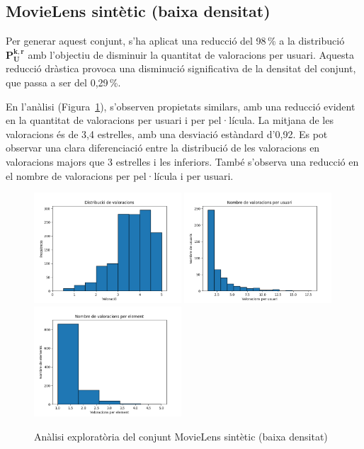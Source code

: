 \documentclass[a4paper,12pt]{report}
\begin{document}
\subsection{MovieLens sintètic (baixa densitat)}

Per generar aquest conjunt, s'ha aplicat una reducció del 98\,\% a la distribució $\mathbf{P_U^{k,r}}$ amb l'objectiu de disminuir la quantitat de valoracions per usuari.
Aquesta reducció dràstica provoca una disminució significativa de la densitat del conjunt, que passa a ser del 0,29\,\%.

En l'anàlisi (Figura~\ref{fig:analisis_ml_synthetic_low_dens}), s'observen propietats similars, amb una reducció evident en la quantitat de valoracions per usuari i per pel·lícula. La mitjana de les valoracions és de 3,4 estrelles, amb una desviació estàndard d'0,92.
Es pot observar una clara diferenciació entre la distribució de les valoracions en valoracions majors que 3 estrelles i les inferiors.
També s'observa una reducció en el nombre de valoracions per pel·lícula i per usuari.

\begin{figure} [H]
    \centering
    \includegraphics[width=0.49\textwidth]{Figuras/syn03-ratings.png}
    \hfill
    \includegraphics[width=0.49\textwidth]{Figuras/syn03-users.png}
    \hfill
    \includegraphics[width=0.49\textwidth]{Figuras/syn03-items.png}
    \caption{Anàlisi exploratòria del conjunt MovieLens sintètic (baixa densitat)}
    \label{fig:analisis_ml_synthetic_low_dens}
\end{figure}
\end{document}
